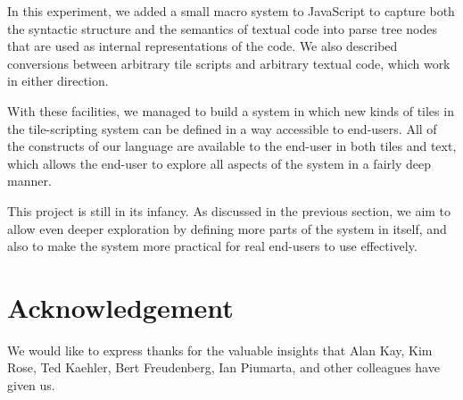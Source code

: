 \label{sec:conclusions}

  In this experiment, we added a small macro system to JavaScript to
capture both the syntactic structure and the semantics of textual code into parse tree nodes that are
used as internal representations of the code.
We also described conversions between arbitrary tile scripts and arbitrary textual code, which work in either direction.

  With these facilities, we managed to build a system in which
new kinds of tiles in the tile-scripting system can be defined in a way accessible to end-users.
  All of the constructs of our language are available to the end-user in both tiles
and text, which allows the end-user to explore all aspects of the system in a fairly deep manner.

  This project is still in its infancy.  As discussed in the previous
section, we aim to allow even deeper exploration by defining more parts
of the system in itself, and also to make the system more practical for
real end-users to use effectively.

\section*{Acknowledgement} We would like to express thanks for the
  valuable insights that Alan Kay, Kim Rose, Ted Kaehler, Bert
Freudenberg, Ian Piumarta, and other colleagues have given us.

